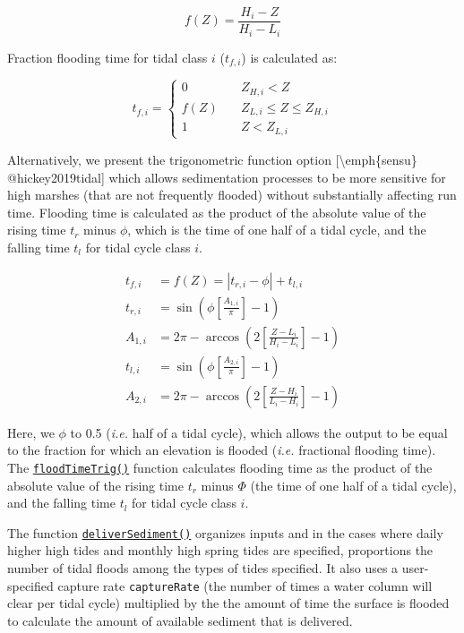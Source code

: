 \begin{equation}
\label{eqn:tidalflood}
f(Z) = \frac{H_{i} - Z}{H_i-L_i}
\end{equation}

Fraction flooding time for tidal class \(i\) (\(t_{f,i}\)) is calculated
as:

\begin{equation} 
\label{eqn:fracflood}
t_{f,i} = \left\{
        \begin{array}{ll}
            0 & \quad  Z_{H,i} < Z \\
             f(Z) & \quad Z_{L,i} \leq  Z \leq Z_{H,i} \\
             1 & \quad  Z < Z_{L,i} 
        \end{array}
    \right.  
\end{equation}

Alternatively, we present the trigonometric function option
{[}\textbackslash emph\{sensu\} @hickey2019tidal{]} which allows
sedimentation processes to be more sensitive for high marshes (that are
not frequently flooded) without substantially affecting run time.
Flooding time is calculated as the product of the absolute value of the
rising time \(t_r\) minus \(\phi\), which is the time of one half of a
tidal cycle, and the falling time \(t_l\) for tidal cycle class \(i\).

\begin{align} 
t_{f,i} &= f(Z) = |t_{r,i} - \phi| + t_{l,i} \\
t_{r,i} &=  \sin\left(\phi \left[\frac{A_{1,i}}{\pi}\right] - 1 \right) \\
A_{1,i} &= 2 \pi - \arccos\left(2 \left[\frac{Z-L_i}{H_i-L_i}\right] - 1\right)\\
t_{l,i} &=  \sin\left(\phi \left[\frac{A_{2,i}}{\pi}\right] - 1\right) \\
A_{2,i} &= 2 \pi - \arccos\left(2 \left[\frac{Z-H_i}{L_i-H_i}\right] - 1\right)
\end{align}

Here, we \(\phi\) to 0.5 (\emph{i.e.} half of a tidal cycle), which
allows the output to be equal to the fraction for which an elevation is
flooded (\emph{i.e.} fractional flooding time). The
\protect\hyperlink{floodtimetrig}{\texttt{floodTimeTrig()}} function
calculates flooding time as the product of the absolute value of the
rising time \(t_r\) minus \(\Phi\) (the time of one half of a tidal
cycle), and the falling time \(t_l\) for tidal cycle class \(i\).

The function
\protect\hyperlink{deliversediment}{\texttt{deliverSediment()}}
organizes inputs and in the cases where daily higher high tides and
monthly high spring tides are specified, proportions the number of tidal
floods among the types of tides specified. It also uses a user-specified
capture rate \texttt{captureRate} (the number of times a water column
will clear per tidal cycle) multiplied by the the amount of time the
surface is flooded to calculate the amount of available sediment that is
delivered.

